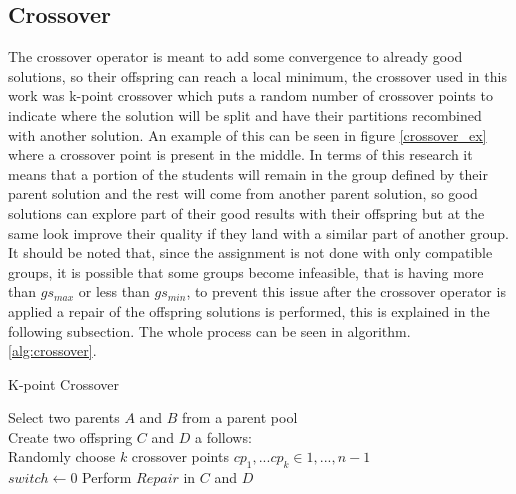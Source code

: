 \subsection{Crossover}

The crossover operator is meant to add some convergence to already good solutions, so their offspring can reach a local minimum, the crossover used in this work was k-point crossover \cite{nomura1997analysis} which puts a random number of crossover points to indicate where the solution will be split and have their partitions recombined with another solution. An example of this can be seen in figure \ref{crossover_ex} where a crossover point is present in the middle. In terms of this research it means that a portion of the students will remain in the group defined by their parent solution and the rest will come from another parent solution, so good solutions can explore part of their good results with their offspring but at the same look improve their quality if they land with a similar part of another group.\\

It should be noted that, since the assignment is not done with only compatible groups, it is possible that some groups become infeasible, that is having more than $gs_{max}$ or less than $gs_{min}$, to prevent this issue after the crossover operator is applied a repair of the offspring solutions is performed, this is explained in the following subsection. The whole process can be seen in algorithm.\\ \ref{alg:crossover}.

\begin{algorithm}[H]
    \caption{K-point Crossover}
    \label{alg:crossover}
    \SetAlgoLined 
Select two parents $A$ and $B$ from a parent pool\;\\
Create two offspring $C$ and $D$ a follows:\;\\
Randomly choose $k$ crossover points $cp_1,...cp_k \in {1,...,n-1}$\;\\
$switch \gets 0$
Perform $Repair$ in $C$ and $D$
\end{algorithm}

